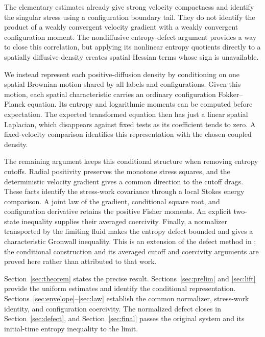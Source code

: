 \documentclass[11pt]{article}
\numberwithin{equation}{section}
\begin{document}
The elementary estimates already give strong velocity compactness and identify
the singular stress using a configuration boundary tail. They do not identify
the product of a weakly convergent velocity gradient with a weakly convergent
configuration moment. The nondiffusive entropy-defect argument provides a
way to close this correlation, but applying its nonlinear entropy quotients
directly to a spatially diffusive density creates spatial Hessian terms whose
sign is unavailable.

We instead represent each positive-diffusion density by conditioning on one
spatial Brownian motion shared by all labels and configurations. Given this
motion, each spatial characteristic carries an ordinary configuration
Fokker--Planck equation. Its entropy and logarithmic moments can be computed
before expectation. The expected transformed equation then has just a linear
spatial Laplacian, which disappears against fixed tests as its coefficient
tends to zero. A fixed-velocity comparison identifies this representation with
the chosen coupled density.

The remaining argument keeps this conditional structure when removing entropy
cutoffs. Radial positivity preserves the monotone stress squares, and the
deterministic velocity gradient gives a common direction to the cutoff drags.
These facts identify the stress-work covariance through a local Stokes energy
comparison. A joint law of the gradient, conditional square root, and
configuration derivative retains the positive Fisher moments. An explicit
two-state inequality supplies their averaged coercivity. Finally, a normalizer
transported by the limiting fluid makes the entropy defect bounded and gives a
characteristic Gronwall inequality. This is an extension of the defect method
in \cite{Masmoudi}; the conditional construction and its averaged cutoff and
coercivity arguments are proved here rather than attributed to that work.

Section~\ref{sec:theorem} states the precise result. Sections~\ref{sec:prelim}
and \ref{sec:lift} provide the uniform estimates and identify the conditional
representation. Sections~\ref{sec:envelope}--\ref{sec:law} establish the common
normalizer, stress-work identity, and configuration coercivity. The normalized
defect closes in Section~\ref{sec:defect}, and Section~\ref{sec:final} passes
the original system and its initial-time entropy inequality to the limit.
\end{document}
